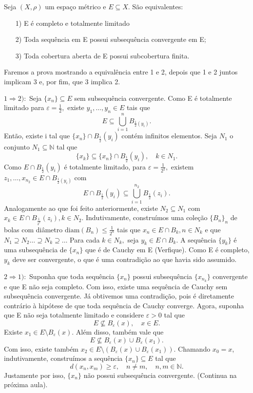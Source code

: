 \documentclass[metric_notes.tex]{subfiles}
\begin{document}
\begin{theorem*}
	Seja \((X, \rho )\) um espaço métrico e \(E\subseteq{X}.\) São equivalentes:
	\begin{itemize}
		\item[1)]E é completo e totalmente limitado
		\item[2)] Toda sequência em E possui subsequência convergente em E;
		\item[3)] Toda cobertura aberta de E possui subcobertura finita.
	\end{itemize}
\end{theorem*}
\begin{proof*}
	Faremos a prova mostrando a equivalência entre 1 e 2, depois que 1 e 2 juntos implicam 3 e, por fim, que 3 implica 2.

	\(1 \Rightarrow 2):\) Seja \(\{x_{n}\}\subseteq{E}\) sem subsequência convergente. Como E é totalmente limitado para \(\varepsilon = \frac{1}{2},\) existe
	\(y_{1}, \dotsc, y_{n}\in E\) tais que
	\[
		E\subseteq{\bigcup_{i=1}^{n}{B_{\frac{1}{2}(y_{i})}}}.
	\]
	Então, existe i tal que \(\{x_{n}\}\cap B_{\frac{1}{2}}(y_{i})\) contém infinitos elementos. Seja \(N_{1}\) o conjunto \(N_{1}\subseteq{\mathbb{N}}\) tal que
	\[
		\{x_{k}\}\subseteq{\{x_{n}\}\cap B_{\frac{1}{2}}(y_{i}),}\quad k\in N_{1}.
	\]
	Como \(E\cap B_{\frac{1}{2}}(y_{i})\) é totalmente limitado, para \(\varepsilon = \frac{1}{2^{2}},\) existem \(z_{1}, \dotsc, x_{n_{2}}\in E\cap B_{\frac{1}{2}(y_{i})}\)
	com
	\[
		E\cap B_{\frac{1}{2}}(y_{i})\subseteq{\bigcup_{i=1}^{n_{2}}{B_{\frac{1}{2}}(z_{i})}}.
	\]
	Analogamente ao que foi feito anteriormente, existe \(N_{2}\subseteq{N_{1}}\) com \(x_{k}\in E\cap B_{\frac{1}{2^{2}}}(z_{i}), k \in N_{2}\). Indutivamente, construímos uma coleção
	\(\{B_{n}\}_{n}\) de bolas com diâmetro \(\mathrm{diam}(B_{n})\leq \frac{1}{2^{n}}\) tais que \(x_{n}\in E\cap B_{k}, n\in N_{k}\) e que \(N_{1}\supseteq{N_{2}}\dotsc \supseteq{N_{k}}\supseteq{\dotsc}\)
	Para cada \(k\in N_{k},\) seja \(y_{k}\in E\cap B_{k}.\) A sequência \(\{y_{k}\}\) é uma subsequência de \(\{x_{n}\}\) que é de Cauchy em E (Verfique). Como E é completo,
	\(y_{k}\) deve ser convergente, o que é uma contradição ao que havia sido assumido.

	\(2 \Rightarrow 1):\) Suponha que toda sequência \(\{x_{n}\}\) possui subsequência \(\{x_{n_{k}}\}\) convergente e que E não seja completo. Com isso, existe uma
	sequência de Cauchy sem subsequência convergente. Já obtivemos uma contradição, pois é diretamente contrário à hipótese de que toda sequência de Cauchy converge. Agora, suponha que E
	não seja totalmente limitado e considere \(\varepsilon >0\) tal que
	\[
		E\not\subseteq{B_{\varepsilon }(x)}, \quad x\in E.
	\]
	Existe \(x_{1}\in E\setminus{B_{\varepsilon }(x)}\). Além disso, também vale que
	\[
		E\not\subseteq{B_{\varepsilon }(x)\cup B_{\varepsilon }(x_{1})}.
	\]
	Com isso, existe também \(x_{2}\in E\setminus{(B_{\varepsilon }(x)\cup B_{\varepsilon }(x_{1}))}\). Chamando
	\(x_{0} = x\), indutivamente, construímos a sequência \(\{x_{n}\}\subseteq{E}\) tal que
	\[
		d(x_{n}, x_{m})\geq \varepsilon, \quad n\neq m,\quad n, m\in \mathbb{N}.
	\]
	Justamente por isso, \(\{x_{n}\}\) não possui subsequência convergente. (Continua na próxima aula).
\end{proof*}
\end{document}
